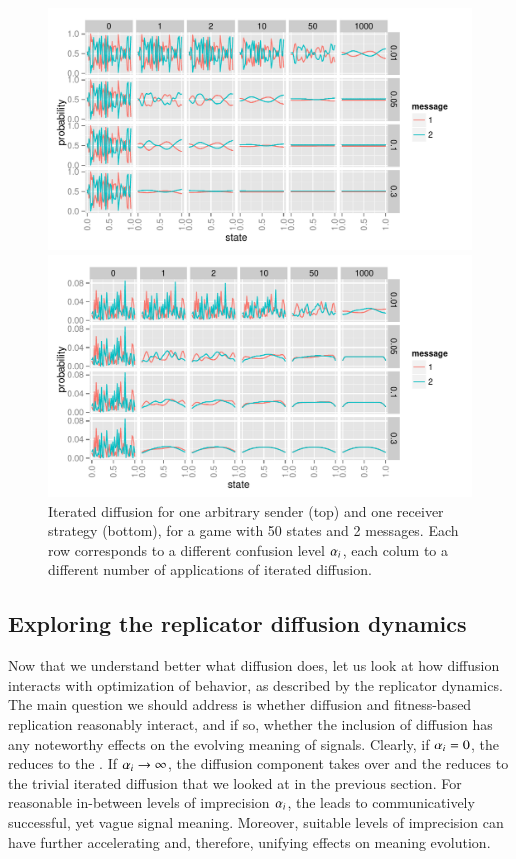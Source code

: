 \begin{figure}
  \centering

  \includegraphics[width=\textwidth]{plots/confusion_sender.pdf}
  
  \includegraphics[width=\textwidth]{plots/confusion_receiver.pdf}

  \caption{Iterated diffusion for one arbitrary sender (top) and one
    receiver strategy (bottom), for a game with 50 states and 2
    messages. Each row corresponds to a different confusion level
    $\alpha_i$, each colum to a different number of applications of
    iterated diffusion.}
  \label{fig:confusion-SenRec}
\end{figure}

\subsection{Exploring the replicator diffusion dynamics}
\label{sec:simulations}

Now that we understand better what diffusion does, let us look at how
diffusion interacts with optimization of behavior, as described by the
replicator dynamics. The main question we should address is whether
diffusion and fitness-based replication reasonably interact, and if
so, whether the inclusion of diffusion has any noteworthy effects on
the evolving meaning of signals. Clearly, if $\alpha_i = 0$, the
\rdd reduces to the \rd. If $\alpha_i \rightarrow \infty$, the
diffusion component takes over and the \rdd reduces to the trivial
iterated diffusion that we looked at in the previous section. For
reasonable in-between levels of imprecision $\alpha_i$, the \rdd
leads to communicatively successful, yet vague signal
meaning. Moreover, suitable levels of imprecision can have further
accelerating and, therefore, unifying effects on meaning evolution.

